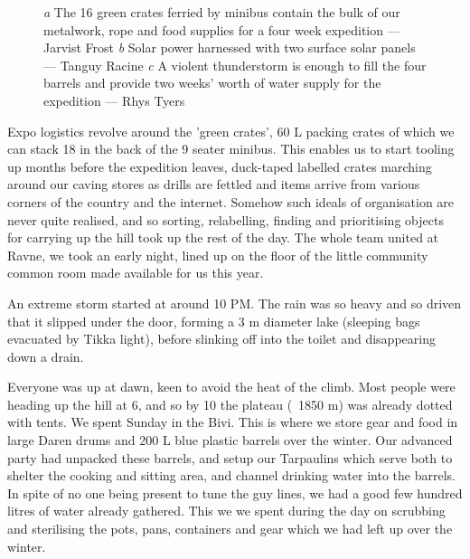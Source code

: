 \begin{figure*}[t!]
\checkoddpage \ifoddpage \forcerectofloat \else \forceversofloat \fi
\centering
    \begin{subfigure}[t]{0.413\textwidth}
        \centering
        \caption{} \label{ben with crates}
    \end{subfigure}
        \hfill
\begin{subfigure}[t]{0.577\textwidth}
\centering
{}
 \caption{}\label{solar panels}
\end{subfigure}
\vfill
\begin{subfigure}[t]{\textwidth}
\centering
{}
 \caption{}\label{full barrel}
\end{subfigure}
  \caption{
    \emph{a} The 16 green crates ferried by minibus contain the bulk of our metalwork, rope and food supplies for a four week expedition --- Jarvist Frost
     \emph{b}  Solar power harnessed with two surface solar panels --- Tanguy Racine
     \emph{c}  A violent thunderstorm is enough to fill the four barrels and provide two weeks' worth of water supply for the expedition ---  Rhys Tyers}
\end{figure*}


Expo logistics revolve around the 'green crates', 60 L packing crates of which we can stack 18 in the back of the 9 seater minibus. This enables us to start tooling up months before the expedition leaves, duck-taped labelled crates marching around our caving stores as drills are fettled and items arrive from various corners of the country and the internet. Somehow such ideals of organisation are never quite realised, and so sorting, relabelling, finding and prioritising objects for carrying up the hill took up the rest of the day. The whole team united at Ravne, we took an early night, lined up on the floor of the little community common room made available for us this year. 

An extreme storm started at around 10 PM. The rain was so heavy and so driven that it slipped under the door, forming a 3 m diameter lake (sleeping bags evacuated by Tikka light), before slinking off into the toilet and disappearing down a drain.

Everyone was up at dawn, keen to avoid the heat of the climb. Most people were heading up the hill at 6, and so by 10 the plateau (~1850 m) was already dotted with tents. We spent Sunday in the Bivi. This is where we store gear and food in large Daren drums and 200 L blue plastic barrels over the winter. Our advanced party had unpacked these barrels, and setup our Tarpaulins which serve both to shelter the cooking and sitting area, and channel drinking water into the barrels. In spite of no one being present to tune the guy lines, we had a good few hundred litres of water already gathered. This we we spent during the day on scrubbing and sterilising the pots, pans, containers and gear which we had left up over the winter. 

